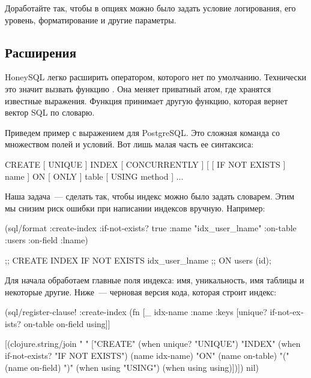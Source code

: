 Доработайте  так, чтобы в опциях можно было задать условие логирования, его уровень, форматирование и другие параметры.

\subsection{Расширения}

HoneySQL легко расширить оператором, которого нет по умолчанию. Технически это значит вызвать функцию . Она меняет приватный атом, где хранятся известные выражения. Функция принимает другую функцию, которая вернет вектор SQL по словарю.

Приведем пример с выражением  для PostgreSQL. Это сложная команда со множеством полей и условий. Вот лишь малая часть ее синтаксиса:

\begin{english}
  \begin{sql}
CREATE [ UNIQUE ] INDEX [ CONCURRENTLY ]
    [ [ IF NOT EXISTS ] name ]
    ON [ ONLY ] table
    [ USING method ] ...
  \end{sql}
\end{english}

Наша задача~--- сделать так, чтобы индекс можно было задать словарем. Этим мы снизим риск ошибки при написании индексов вручную. Например:

\begin{english}
  \begin{clojure}
(sql/format
  {:create-index {:if-not-exists? true
                  :name "idx_user_lname"
                  :on-table :users
                  :on-field :lname}})

;; CREATE INDEX IF NOT EXISTS idx_user_lname
;; ON users (id);
  \end{clojure}
\end{english}

Для начала обработаем главные поля индекса: имя, уникальность, имя таблицы и некоторые другие. Ниже~--- черновая версия кода, которая строит индекс:

\begin{english}
  \begin{clojure}
(sql/register-clause!
 :create-index
 (fn [_ {idx-name :name
         :keys [unique?
                if-not-exists?
                on-table
                on-field
                using]}]

   [(clojure.string/join
     " "
     ["CREATE"
      (when unique? "UNIQUE")
      "INDEX"
      (when if-not-exists? "IF NOT EXISTS")
      (name idx-name)
      "ON"
      (name on-table)
      "(" (name on-field) ")"
      (when using "USING")
      (when using using)])])
 nil)
  \end{clojure}
\end{english}

